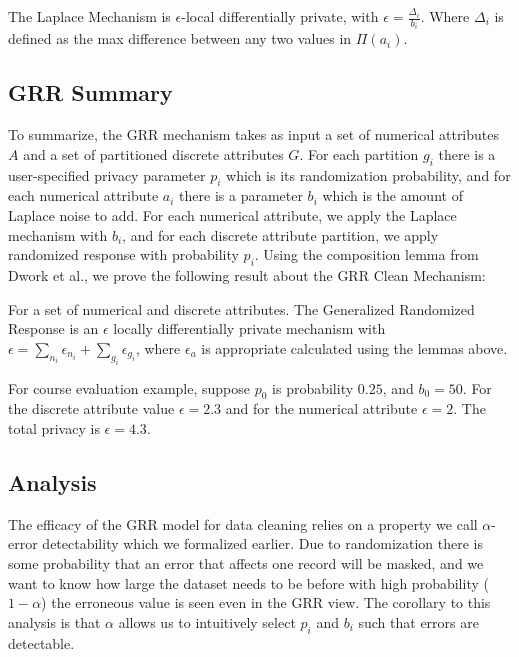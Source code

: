 \begin{lemma}
The Laplace Mechanism is $\epsilon$-local differentially
private, with $\epsilon = \frac{\Delta_i}{b_i}$. Where $\Delta_i$ is defined as the max
difference between any two values in $\Pi(a_i)$.
\end{lemma}

\subsection{GRR Summary}
To summarize, the GRR mechanism takes as input a set of numerical attributes $A$ and a set of partitioned discrete attributes $G$.
For each partition $g_i$ there is a user-specified privacy parameter $p_i$ which is its randomization probability, and for each numerical attribute $a_i$ there is a parameter $b_i$ which is the amount of Laplace noise to add.
For each numerical attribute, we apply the Laplace mechanism with $b_i$, and for each discrete attribute partition, we apply randomized response with probability $p_i$. 
Using the composition lemma from Dwork et al., we prove the following result about the GRR Clean Mechanism:

\begin{theorem}
For a set of numerical and discrete attributes. The Generalized Randomized Response is an $\epsilon$ locally differentially private mechanism with $\epsilon = \sum_{n_i} \epsilon_{n_i} + \sum_{g_i} \epsilon_{g_i}$, where $\epsilon_a$ is appropriate calculated using the lemmas above.
\end{theorem}

\begin{example}
For course evaluation example, suppose $p_0$ is probability $0.25$, and $b_0 = 50$.
For the discrete attribute value $\epsilon = 2.3$ and for the numerical attribute $\epsilon=2$.
The total privacy is $\epsilon = 4.3$.  
\end{example}

\subsection{Analysis}
The efficacy of the GRR model for data cleaning relies on a property we call $\alpha$-error detectability which we formalized earlier.
Due to randomization there is some probability that an error that affects one record will be masked, and we want to know how large the dataset needs to be before with high probability ($1-\alpha$) the erroneous value is seen even in the GRR view. 
The corollary to this analysis is that $\alpha$ allows us to intuitively select $p_i$ and $b_i$ such that errors are detectable. 

